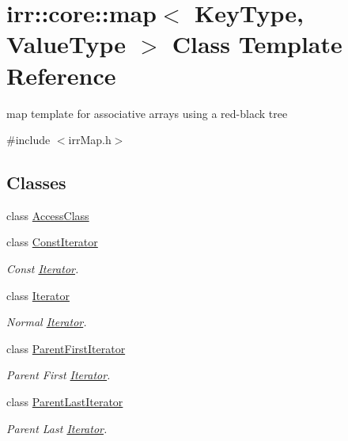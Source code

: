 \hypertarget{classirr_1_1core_1_1map}{}\section{irr\+:\+:core\+:\+:map$<$ Key\+Type, Value\+Type $>$ Class Template Reference}
\label{classirr_1_1core_1_1map}


map template for associative arrays using a red-\/black tree  




{\ttfamily \#include $<$irr\+Map.\+h$>$}

\subsection*{Classes}
\begin{DoxyCompactItemize}
\item 
class \hyperlink{classirr_1_1core_1_1map_1_1AccessClass}{Access\+Class}
\item 
class \hyperlink{classirr_1_1core_1_1map_1_1ConstIterator}{Const\+Iterator}
\begin{DoxyCompactList}\small\item\em Const \hyperlink{classirr_1_1core_1_1map_1_1Iterator}{Iterator}. \end{DoxyCompactList}\item 
class \hyperlink{classirr_1_1core_1_1map_1_1Iterator}{Iterator}
\begin{DoxyCompactList}\small\item\em Normal \hyperlink{classirr_1_1core_1_1map_1_1Iterator}{Iterator}. \end{DoxyCompactList}\item 
class \hyperlink{classirr_1_1core_1_1map_1_1ParentFirstIterator}{Parent\+First\+Iterator}
\begin{DoxyCompactList}\small\item\em Parent First \hyperlink{classirr_1_1core_1_1map_1_1Iterator}{Iterator}. \end{DoxyCompactList}\item 
class \hyperlink{classirr_1_1core_1_1map_1_1ParentLastIterator}{Parent\+Last\+Iterator}
\begin{DoxyCompactList}\small\item\em Parent Last \hyperlink{classirr_1_1core_1_1map_1_1Iterator}{Iterator}. \end{DoxyCompactList}\end{DoxyCompactItemize}
